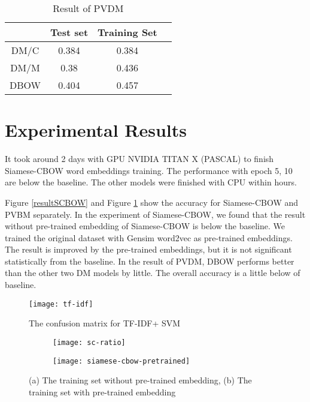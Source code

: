 \begin{table}[]
\centering
\caption{Result of PVDM}
\label{resultPVDM}
\begin{tabular}{|c|c|c|c|}
\hline
      & Test set & Training Set \\
\hline
DM/C  & 0.384 &  0.384 \\
DM/M &  0.38  & 0.436 \\
DBOW &  0.404  & 0.457 \\
\hline
\end{tabular}
\end{table}

\section{Experimental Results}

It took around 2 days with GPU NVIDIA TITAN X (PASCAL) to finish Siamese-CBOW word embeddings training. The performance with epoch 5, 10 are below the baseline. 
The other models were finished with CPU within hours.

Figure \ref{resultSCBOW} and Figure \ref{resultPVDM} show the accuracy for Siamese-CBOW and PVBM separately. 
In the experiment of Siamese-CBOW, we found that the result without pre-trained embedding of Siamese-CBOW is below the baseline. We trained the original dataset with Gensim word2vec as pre-trained embeddings.
The result is improved by the pre-trained embeddings, but it is not significant statistically from the baseline. 
In the result of PVDM, DBOW performs better than the other two DM models by little. 
The overall accuracy is a little below of baseline.


\begin{figure}[h]
    \centering
	\texttt{[image: tf-idf]}
    \caption{The confusion matrix for TF-IDF+ SVM}
    \label{confusion1}
\end{figure}

\begin{figure}
\centering
\begin{subfigure}[b]{1\textwidth}
   \texttt{[image: sc-ratio]}
   \caption{}
   \label{confusion2} 
\end{subfigure}

\begin{subfigure}[b]{1\textwidth}
   \texttt{[image: siamese-cbow-pretrained]}
   \caption{}
   \label{confusion5}
\end{subfigure}
\caption[Confusion Matrix of Siamese-CBOW]{(a) The training set without pre-trained embedding,
(b) The training set with pre-trained embedding
}
\end{figure}



